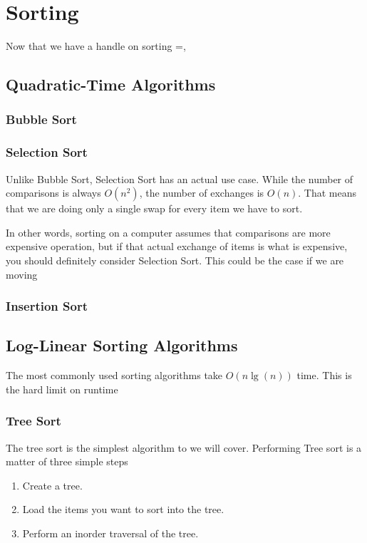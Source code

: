 
\chapter{Sorting}

Now that we have a handle on sorting =,


\section{Quadratic-Time Algorithms}

\subsection{Bubble Sort}

\subsection{Selection Sort}

Unlike Bubble Sort, Selection Sort has an actual use case.  
While the number of comparisons is always $O(n^2)$, the number of exchanges is $O(n)$.  
That means that we are doing only a single swap for every item we have to sort.

In other words, sorting on a computer assumes that comparisons are more expensive operation, but if that actual exchange of items is what is expensive, you should definitely consider Selection Sort.
This could be the case if we are moving 

\subsection{Insertion Sort}


\section{Log-Linear Sorting Algorithms}
The most commonly used sorting algorithms take $ O(n \lg(n)) $ time.
This is the hard limit on runtime %
\subsection{Tree Sort}
The tree sort is the simplest algorithm to we will cover. Performing Tree sort is a matter of three simple steps

\begin{enumerate}
	\item Create a tree.
	\item Load the items you want to sort into the tree.
	\item Perform an inorder traversal of the tree.
\end{enumerate}


